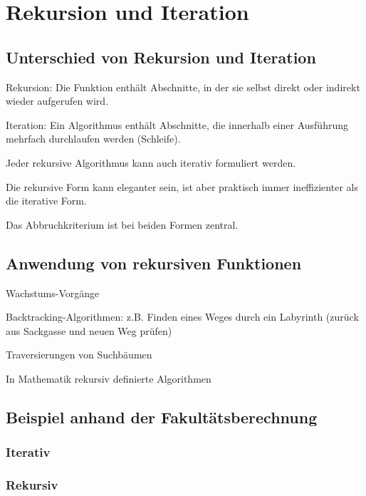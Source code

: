 \section{Rekursion und Iteration }
	\subsection{Unterschied von Rekursion und Iteration }
		\begin{compactitem}
			\item Rekursion: Die Funktion enthält Abschnitte, in der sie selbst direkt oder indirekt wieder	aufgerufen wird.
			\item Iteration: Ein Algorithmus enthält Abschnitte, die innerhalb einer Ausführung mehrfach durchlaufen werden (Schleife).
			\item Jeder rekursive Algorithmus kann auch iterativ formuliert werden.
			\item Die rekursive Form kann eleganter sein, ist aber praktisch immer ineffizienter als die iterative Form.
			\item Das Abbruchkriterium ist bei beiden Formen zentral.
		\end{compactitem}
		
	\subsection{Anwendung von rekursiven Funktionen }
		\begin{compactitem}
			\item Wachstums-Vorgänge 
			\item Backtracking-Algorithmen:	z.B. Finden eines Weges durch ein Labyrinth (zurück aus Sackgasse und neuen	Weg prüfen)
			\item Traversierungen von Suchbäumen
			\item In Mathematik rekursiv definierte Algorithmen
		\end{compactitem}	
	
	\subsection{Beispiel anhand der Fakultätsberechnung }
		\begin{minipage}[t]{9 cm}
			\subsubsection{Iterativ}	
				
		\end{minipage}
		\hspace*{0.5cm}
		\begin{minipage}[t]{9 cm}
			\subsubsection{Rekursiv}
				
		\end{minipage}
		

